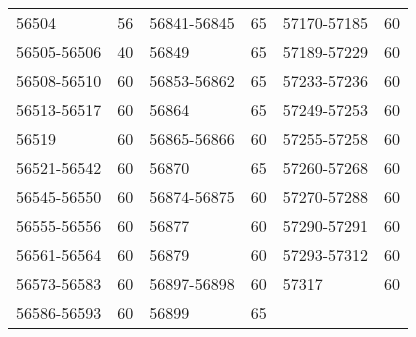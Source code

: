 \begin{center}
\begin{singlespacing}
\begin{longtable}{lr|lr|lr}
56504 & 56 & 56841-56845 & 65 & 57170-57185 & 60 \\
56505-56506 & 40 & 56849 & 65 & 57189-57229 & 60 \\
56508-56510 & 60 & 56853-56862 & 65 & 57233-57236 & 60 \\
56513-56517 & 60 & 56864 & 65 & 57249-57253 & 60 \\
56519 & 60 & 56865-56866 & 60 & 57255-57258 & 60 \\
56521-56542 & 60 & 56870 & 65 & 57260-57268 & 60 \\
56545-56550 & 60 & 56874-56875 & 60 & 57270-57288 & 60 \\
56555-56556 & 60 & 56877 & 60 & 57290-57291 & 60 \\
56561-56564 & 60 & 56879 & 60 & 57293-57312 & 60 \\
56573-56583 & 60 & 56897-56898 & 60 & 57317 & 60 \\
56586-56593 & 60 & 56899 & 65 & & \\

\end{longtable}
\end{singlespacing}
\end{center}
